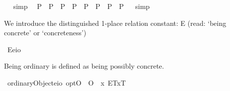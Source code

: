 \begin{isabellebody}
\isadelimproof
\ %
\endisadelimproof
%
\isatagproof
{}\isamarkupfalse%
\ simp\ \isamarkupfalse%
%
\endisatagproof
{\isafoldproof}%
%
\isadelimproof
%
\endisadelimproof
\isanewline
{}\isamarkupfalse%
\ {\isachardoublequoteopen}{\isacharparenleft}{\isacharparenleft}{\isasymphi}\isactrlsup P{\isacharparenright}\ \isactrlbold {\isasymand}\ {\isacharparenleft}{\isasympsi}\isactrlsup P{\isacharparenright}\ \isactrlbold {\isasymequiv}\ {\isacharparenleft}{\isasymphi}\isactrlsup P{\isacharparenright}\ \isactrlbold {\isasymand}\ {\isacharparenleft}{\isasympsi}\isactrlsup P{\isacharparenright}{\isacharparenright}\ {\isasymequiv}\ {\isacharparenleft}{\isacharparenleft}{\isasymphi}\isactrlsup P{\isacharparenright}\ \isactrlbold {\isasymand}\ {\isacharparenleft}{\isacharparenleft}{\isasympsi}\isactrlsup P{\isacharparenright}\ \isactrlbold {\isasymequiv}\ {\isacharparenleft}{\isasymphi}\isactrlsup P{\isacharparenright}{\isacharparenright}\ \isactrlbold {\isasymand}\ {\isacharparenleft}{\isasympsi}\isactrlsup P{\isacharparenright}{\isacharparenright}{\isachardoublequoteclose}%
\isadelimproof
\ %
\endisadelimproof
%
\isatagproof
{}\isamarkupfalse%
\ simp%
\endisatagproof
{\isafoldproof}%
%
\isadelimproof
%
\endisadelimproof
\ \isamarkupfalse%
%
\isadelimproof
\ %
\endisadelimproof
%
\isatagproof
{}\isamarkupfalse%
\ %
%
\endisatagproof
{\isafoldproof}%
%
\isadelimproof
%
\endisadelimproof
%
\isamarkuptrue%
%
\begin{isamarkuptext}%
We introduce the distinguished 1-place relation constant: E (read: ‘being concrete’ or ‘concreteness’)%
\end{isamarkuptext}%
\isamarkuptrue%
\isamarkupfalse%
\ E{\isacharcolon}{\isacharcolon}{\isachardoublequoteopen}{\isacharparenleft}e{\isasymRightarrow}io{\isacharparenright}{\isachardoublequoteclose}%
\begin{isamarkuptext}%
Being ordinary is defined as being possibly concrete.%
\end{isamarkuptext}%
\isamarkuptrue%
\isamarkupfalse%
\ ordinaryObject{\isacharcolon}{\isacharcolon}{\isachardoublequoteopen}{\isacharparenleft}e{\isasymRightarrow}io{\isacharparenright}\ opt{\isachardoublequoteclose}{\isacharparenleft}{\isachardoublequoteopen}O{\isacharbang}{\isachardoublequoteclose}{\isacharparenright}\ \ {\isachardoublequoteopen}O{\isacharbang}\ {\isasymequiv}\ \isactrlbold {\isasymlambda}x{\isachardot}\ \isactrlbold {\isasymdiamond}{\isasymlparr}E\isactrlsup T{\isacharcomma}x\isactrlsup T{\isasymrparr}{\isachardoublequoteclose}%

\end{isabellebody}
